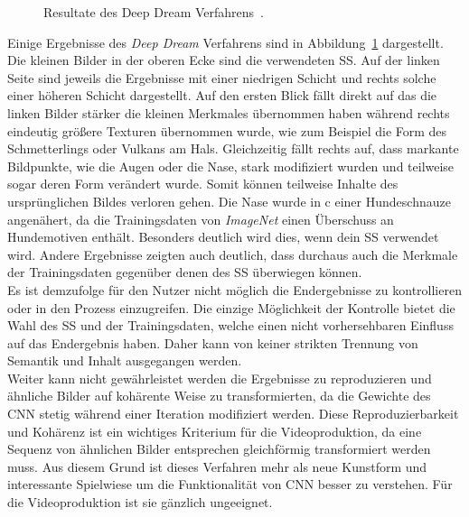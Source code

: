 \documentclass[times, 11pt,twocolumn]{article}
\begin{document}
\begin{figure}
	\caption{Resultate des Deep Dream Verfahrens~\cite{McCaigDG16}.}
	\label{fig:DeepDreamResults}
\end{figure}

Einige Ergebnisse des \textit{Deep Dream} Verfahrens sind in Abbildung~\ref{fig:DeepDreamResults} dargestellt. Die kleinen Bilder in der oberen Ecke sind die verwendeten SS. Auf der linken Seite sind jeweils die Ergebnisse mit einer niedrigen Schicht und rechts solche einer höheren Schicht dargestellt. Auf den ersten Blick fällt direkt auf das die linken Bilder stärker die kleinen Merkmales übernommen haben während rechts eindeutig größere Texturen übernommen wurde, wie zum Beispiel die Form des Schmetterlings oder Vulkans am Hals. Gleichzeitig fällt rechts auf, dass markante Bildpunkte, wie die Augen oder die Nase, stark modifiziert wurden und teilweise sogar deren Form verändert wurde. Somit können teilweise Inhalte des ursprünglichen Bildes verloren gehen. Die Nase wurde in c einer Hundeschnauze angenähert, da die Trainingsdaten von \textit{ImageNet} einen Überschuss an Hundemotiven enthält. Besonders deutlich wird dies, wenn dein SS verwendet wird\cite{McCaigDG16}. Andere Ergebnisse zeigten auch deutlich, dass durchaus auch die Merkmale der Trainingsdaten gegenüber denen des SS überwiegen können.
\\
Es ist demzufolge für den Nutzer nicht möglich die Endergebnisse zu kontrollieren oder in den Prozess einzugreifen. Die einzige Möglichkeit der Kontrolle bietet die Wahl des SS und der Trainingsdaten, welche einen nicht vorhersehbaren Einfluss auf das Endergebnis haben. Daher kann von keiner strikten Trennung von Semantik und Inhalt ausgegangen werden. \\
Weiter kann nicht gewährleistet werden die Ergebnisse zu reproduzieren und ähnliche Bilder auf kohärente  Weise zu transformierten, da die Gewichte des CNN stetig während einer Iteration modifiziert werden. Diese Reproduzierbarkeit und Kohärenz ist ein wichtiges Kriterium für die Videoproduktion, da eine Sequenz von ähnlichen Bilder entsprechen gleichförmig transformiert werden muss. Aus diesem Grund ist dieses Verfahren mehr als neue Kunstform und interessante Spielwiese um die Funktionalität von CNN besser zu verstehen. Für die Videoproduktion ist sie gänzlich ungeeignet.
\end{document}
